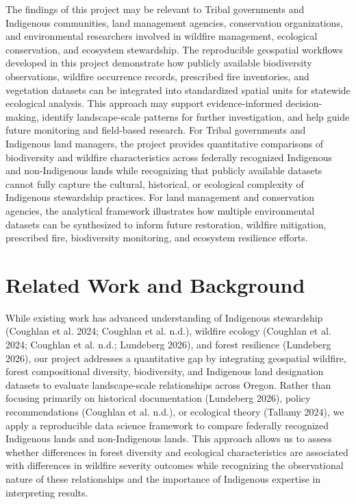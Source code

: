 \documentclass[
  letterpaper,
  DIV=11,
  numbers=noendperiod]{scrartcl}
\begin{document}
The findings of this project may be relevant to Tribal governments and
Indigenous communities, land management agencies, conservation
organizations, and environmental researchers involved in wildfire
management, ecological conservation, and ecosystem stewardship. The
reproducible geospatial workflows developed in this project demonstrate
how publicly available biodiversity observations, wildfire occurrence
records, prescribed fire inventories, and vegetation datasets can be
integrated into standardized spatial units for statewide ecological
analysis. This approach may support evidence-informed decision-making,
identify landscape-scale patterns for further investigation, and help
guide future monitoring and field-based research. For Tribal governments
and Indigenous land managers, the project provides quantitative
comparisons of biodiversity and wildfire characteristics across
federally recognized Indigenous and non-Indigenous lands while
recognizing that publicly available datasets cannot fully capture the
cultural, historical, or ecological complexity of Indigenous stewardship
practices. For land management and conservation agencies, the analytical
framework illustrates how multiple environmental datasets can be
synthesized to inform future restoration, wildfire mitigation,
prescribed fire, biodiversity monitoring, and ecosystem resilience
efforts.

\section{Related Work and Background}\label{related-work-and-background}

While existing work has advanced understanding of Indigenous stewardship
(Coughlan et al. 2024; Coughlan et al. n.d.), wildfire ecology (Coughlan
et al. 2024; Coughlan et al. n.d.; Lundeberg 2026), and forest
resilience (Lundeberg 2026), our project addresses a quantitative gap by
integrating geospatial wildfire, forest compositional diversity,
biodiversity, and Indigenous land designation datasets to evaluate
landscape-scale relationships across Oregon. Rather than focusing
primarily on historical documentation (Lundeberg 2026), policy
recommendations (Coughlan et al. n.d.), or ecological theory (Tallamy
2024), we apply a reproducible data science framework to compare
federally recognized Indigenous lands and non-Indigenous lands. This
approach allows us to assess whether differences in forest diversity and
ecological characteristics are associated with differences in wildfire
severity outcomes while recognizing the observational nature of these
relationships and the importance of Indigenous expertise in interpreting
results.
\end{document}
